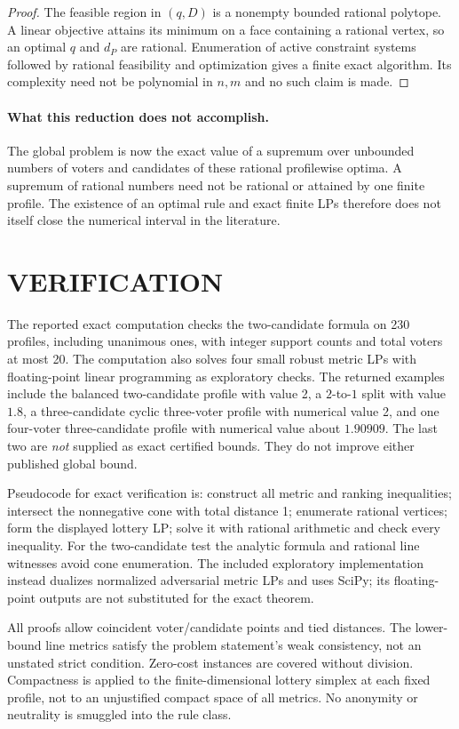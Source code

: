 \documentclass[11pt,a4paper]{article}
\theoremstyle{definition}
\theoremstyle{remark}
\begin{document}
\begin{proof}
The feasible region in $(q,D)$ is a nonempty bounded rational polytope. A linear objective attains its minimum on a face containing a rational vertex, so an optimal $q$ and $d_P$ are rational. Enumeration of active constraint systems followed by rational feasibility and optimization gives a finite exact algorithm. Its complexity need not be polynomial in $n,m$ and no such claim is made.
\end{proof}

\paragraph{What this reduction does not accomplish.}
The global problem is now the exact value of a supremum over unbounded numbers of voters and candidates of these rational profilewise optima. A supremum of rational numbers need not be rational or attained by one finite profile. The existence of an optimal rule and exact finite LPs therefore does not itself close the numerical interval in the literature.

\section{VERIFICATION}
The reported exact computation checks the two-candidate formula on 230 profiles, including unanimous ones, with integer support counts and total voters at most 20. The computation also solves four small robust metric LPs with floating-point linear programming as exploratory checks. The returned examples include the balanced two-candidate profile with value 2, a $2$-to-$1$ split with value $1.8$, a three-candidate cyclic three-voter profile with numerical value 2, and one four-voter three-candidate profile with numerical value about $1.90909$. The last two are \emph{not} supplied as exact certified bounds. They do not improve either published global bound.

Pseudocode for exact verification is: construct all metric and ranking inequalities; intersect the nonnegative cone with total distance 1; enumerate rational vertices; form the displayed lottery LP; solve it with rational arithmetic and check every inequality. For the two-candidate test the analytic formula and rational line witnesses avoid cone enumeration. The included exploratory implementation instead dualizes normalized adversarial metric LPs and uses SciPy; its floating-point outputs are not substituted for the exact theorem.

All proofs allow coincident voter/candidate points and tied distances. The lower-bound line metrics satisfy the problem statement's weak consistency, not an unstated strict condition. Zero-cost instances are covered without division. Compactness is applied to the finite-dimensional lottery simplex at each fixed profile, not to an unjustified compact space of all metrics. No anonymity or neutrality is smuggled into the rule class.
\end{document}

